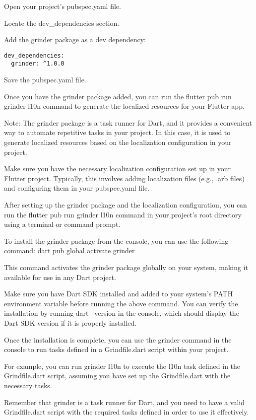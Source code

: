 Open your project's pubspec.yaml file.

Locate the dev\_dependencies section.

Add the grinder package as a dev dependency:

\begin{lstlisting}
dev_dependencies:
  grinder: ^1.0.0
\end{lstlisting}

Save the pubspec.yaml file.

Once you have the grinder package added, you can run the flutter pub run grinder l10n command to generate the 
localized resources for your Flutter app.

Note: The grinder package is a task runner for Dart, and it provides a convenient way to automate repetitive tasks 
in your project. In this case, it is used to generate localized resources based on the localization configuration 
in your project.

Make sure you have the necessary localization configuration set up in your Flutter project. Typically, this 
involves adding localization files (e.g., .arb files) and configuring them in your pubspec.yaml file.

After setting up the grinder package and the localization configuration, you can run the flutter pub run grinder 
l10n command in your project's root directory using a terminal or command prompt.

To install the grinder package from the console, you can use the following command:
dart pub global activate grinder

This command activates the grinder package globally on your system, making it available for use in any Dart project.

Make sure you have Dart SDK installed and added to your system's PATH environment variable before running the 
above command. You can verify the installation by running dart --version in the console, which should display the 
Dart SDK version if it is properly installed.

Once the installation is complete, you can use the grinder command in the console to run tasks defined in a 
Grindfile.dart script within your project.

For example, you can run grinder l10n to execute the l10n task defined in the Grindfile.dart script, assuming 
you have set up the Grindfile.dart with the necessary tasks.

Remember that grinder is a task runner for Dart, and you need to have a valid Grindfile.dart script with the 
required tasks defined in order to use it effectively.

